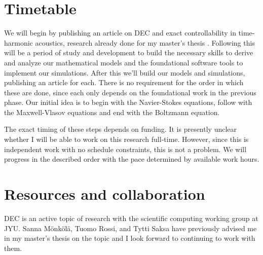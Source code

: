 \documentclass{article}
\begin{document}
\section*{Timetable}

We will begin by publishing an article on DEC and exact controllability
in time-harmonic acoustics, research already done for my master's thesis
\parencite{myyra_discrete_2023}.
Following this will be a period of study and development
to build the necessary skills to derive and analyze our mathematical models
and the foundational software tools to implement our simulations.
After this we'll build our models and simulations,
publishing an article for each.
There is no requirement for the order in which these are done,
since each only depends on the foundational work in the previous phase.
Our initial idea is to begin with the Navier-Stokes equations,
follow with the Maxwell-Vlasov equations and end with the Boltzmann equation.

The exact timing of these steps depends on funding.
It is presently unclear whether I will be able to work on this research full-time.
However, since this is independent work with no schedule constraints,
this is not a problem.
We will progress in the described order with the pace determined by available work hours.

\section*{Resources and collaboration}

DEC is an active topic of research with the scientific computing working group at JYU.
Sanna Mönkölä, Tuomo Rossi, and Tytti Saksa
have previously advised me in my master's thesis on the topic
and I look forward to continuing to work with them.

\printbibliography
\end{document}
